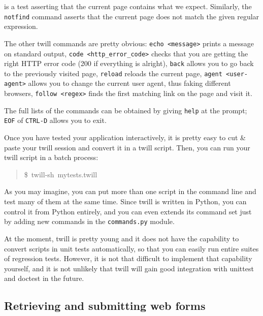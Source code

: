 \documentclass[10pt,a4paper,english]{article}
\begin{document}
is a test asserting that the current page contains what we expect.
Similarly, the \texttt{notfind} command asserts that the current page does
not match the given regular expression.

The other twill commands are pretty obvious: \texttt{echo <message>} 
prints a message on standard output, \texttt{code <http{\_}error{\_}code>} checks 
that you are getting the right HTTP error code (200 if everything is 
alright), \texttt{back} allows you to go back to the previously visited page, 
\texttt{reload} reloads the current page, \texttt{agent <user-agent>} allows you 
to change the current user agent, thus faking different browsers, 
\texttt{follow <regex>} finds the first matching link on the page and visit it.

The full lists of the commands can be obtained 
by giving \texttt{help} at the prompt; \texttt{EOF} of \texttt{CTRL-D} allows you to exit.

Once you have tested your application interactively, it is pretty easy
to cut {\&} paste your twill session and convert it in a twill script.
Then, you can run your twill script in a batch process:
\begin{quote}{\ttfamily \raggedright \noindent
{\$}~twill-sh~mytests.twill
}\end{quote}

As you may imagine, you can put more than one script in the command line and
test many of them at the same time. Since twill is written in Python, you
can control it from Python entirely, and you can even extends its command
set just by adding new commands in the \texttt{commands.py} module.

At the moment, twill is pretty young and it does not have the
capability to convert scripts in unit tests automatically, so that
you can easily run entire suites of regression tests. However,
it is not that difficult to implement that capability yourself,
and it is not unlikely that twill will gain good integration with 
unittest and doctest in the future.



\hypertarget{retrieving-and-submitting-web-forms}{}
\subsection*{Retrieving and submitting web forms}
\end{document}
